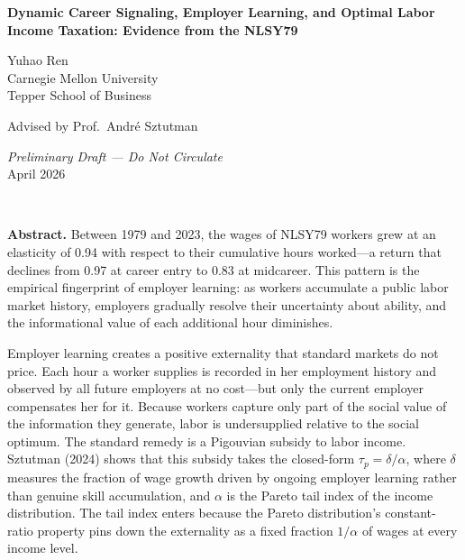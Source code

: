 \documentclass[12pt]{article}
\theoremstyle{definition}
\theoremstyle{remark}
\begin{document}

\begin{titlepage}
\vspace*{2cm}
\begin{center}
{\Large \textbf{Dynamic Career Signaling, Employer Learning, and Optimal Labor Income Taxation: Evidence from the NLSY79}}

\vspace{1.5cm}

{\large Yuhao Ren}\\
{\normalsize Carnegie Mellon University}\\
{\normalsize Tepper School of Business}

\vspace{0.5cm}
{\normalsize Advised by Prof.\ Andr\'{e} Sztutman}

\vspace{1.5cm}
{\normalsize \textit{Preliminary Draft — Do Not Circulate}}\\
{\normalsize April 2026}

\vspace{2cm}
\\[3em]
\begin{minipage}{0.85\textwidth}
\small\textbf{Abstract.}
Between 1979 and 2023, the wages of NLSY79 workers grew at an elasticity of 0.94 with
respect to their cumulative hours worked---a return that declines from 0.97 at career entry
to 0.83 at midcareer. This pattern is the empirical fingerprint of employer learning: as
workers accumulate a public labor market history, employers gradually resolve their uncertainty
about ability, and the informational value of each additional hour diminishes.

Employer learning creates a positive externality that standard markets do not price. Each
hour a worker supplies is recorded in her employment history and observed by all future
employers at no cost---but only the current employer compensates her for it. Because workers
capture only part of the social value of the information they generate, labor is undersupplied
relative to the social optimum. The standard remedy is a Pigouvian subsidy to labor income.
Sztutman (2024) shows that this subsidy takes the closed-form $\tau_p = \delta / \alpha$,
where $\delta$ measures the fraction of wage growth driven by ongoing employer learning rather
than genuine skill accumulation, and $\alpha$ is the Pareto tail index of the income
distribution. The tail index enters because the Pareto distribution's constant-ratio property
pins down the externality as a fixed fraction $1/\alpha$ of wages at every income level.


\end{minipage}
\end{center}
\end{titlepage}
\end{document}

